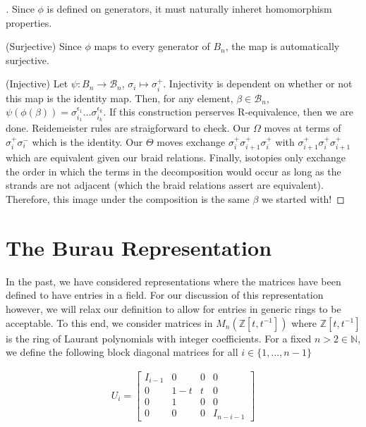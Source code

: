 \documentclass[10pt]{ucthesis}
\newcommand{\Z}{\mathbb{Z}}
\newcommand{\N}{\mathbb{N}}
\begin{document}
\noindent\begin{proof}[\cite{Kassel}] Since $\phi$ is defined on generators, it must naturally inheret homomorphism properties. 

(Surjective) Since $\phi$ maps to every generator of $B_n$, the map is automatically surjective.

(Injective) Let $\psi:B_n\rightarrow\mathcal{B}_n$, $\sigma_i\mapsto\sigma_i^+$. Injectivity is dependent on whether or not this map is the identity map. Then, for any element, $\beta\in\mathcal{B}_n$, $\psi(\phi(\beta)) = \sigma^{\epsilon_1}_{i_1}\hdots\sigma^{\epsilon_k}_{i_k}$. If this construction perserves R-equivalence, then we are done. Reidemeister rules are straigforward to check. Our $\Omega$ moves at terms of $\sigma_i^+\sigma_i^-$ which is the identity. Our $\Theta$ moves exchange $\sigma_i^+\sigma_{i+1}^+\sigma_i^+$ with $\sigma_{i+1}^+\sigma_i^+\sigma_{i+1}^+$ which are equivalent given our braid relations. Finally, isotopies only exchange the order in which the terms in the decomposition would occur as long as the strands are not adjacent (which the braid relations assert are equivalent). Therefore, this image under the composition is the same $\beta$ we started with! \end{proof} 

\section{The Burau Representation}


In the past, we have considered representations where the matrices have been defined to have entries in a field. For our discussion of this representation however, we will relax our definition to allow for entries in generic rings to be acceptable. To this end, we consider matrices in $M_n(\Z[t,t^{-1}])$ where $\Z[t,t^{-1}]$ is the ring of Laurant polynomials with integer coefficients. For a fixed $n>2\in\N$, we define the following block diagonal matrices for all $i\in \{1,\hdots,n-1\}$

\begin{equation}
\begin{aligned}
U_i = \begin{bmatrix}
			I_{i-1}& 0 & 0 & 0 \\
			0 & 1-t & t & 0\\
			0 & 1 & 0 & 0\\
			0 & 0 & 0 & I_{n-i-1}
		\end{bmatrix}
\end{aligned}
\end{equation}
\end{document}
